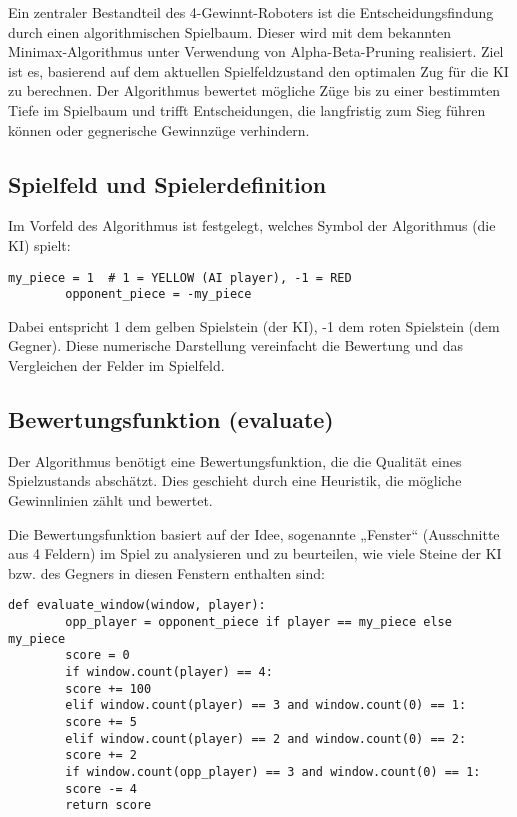 	Ein zentraler Bestandteil des 4-Gewinnt-Roboters ist die Entscheidungsfindung durch einen algorithmischen Spielbaum. Dieser wird mit dem bekannten Minimax-Algorithmus unter Verwendung von Alpha-Beta-Pruning realisiert. Ziel ist es, basierend auf dem aktuellen Spielfeldzustand den optimalen Zug für die KI zu berechnen. Der Algorithmus bewertet mögliche Züge bis zu einer bestimmten Tiefe im Spielbaum und trifft Entscheidungen, die langfristig zum Sieg führen können oder gegnerische Gewinnzüge verhindern.
	
	\subsection*{Spielfeld und Spielerdefinition}
	
	Im Vorfeld des Algorithmus ist festgelegt, welches Symbol der Algorithmus (die KI) spielt:
	
	\begin{lstlisting}[style=pythonstyle]
		my_piece = 1  # 1 = YELLOW (AI player), -1 = RED
		opponent_piece = -my_piece
	\end{lstlisting}
	
	Dabei entspricht 1 dem gelben Spielstein (der KI), -1 dem roten Spielstein (dem Gegner). Diese numerische Darstellung vereinfacht die Bewertung und das Vergleichen der Felder im Spielfeld.
	
	\subsection*{Bewertungsfunktion (evaluate)}
	
	Der Algorithmus benötigt eine Bewertungsfunktion, die die Qualität eines Spielzustands abschätzt. Dies geschieht durch eine Heuristik, die mögliche Gewinnlinien zählt und bewertet.
	
	Die Bewertungsfunktion basiert auf der Idee, sogenannte „Fenster“ (Ausschnitte aus 4 Feldern) im Spiel zu analysieren und zu beurteilen, wie viele Steine der KI bzw. des Gegners in diesen Fenstern enthalten sind:
	
	\begin{lstlisting}[style=pythonstyle]
		def evaluate_window(window, player):
		opp_player = opponent_piece if player == my_piece else my_piece
		score = 0
		if window.count(player) == 4:
		score += 100
		elif window.count(player) == 3 and window.count(0) == 1:
		score += 5
		elif window.count(player) == 2 and window.count(0) == 2:
		score += 2
		if window.count(opp_player) == 3 and window.count(0) == 1:
		score -= 4
		return score
	\end{lstlisting}
	
